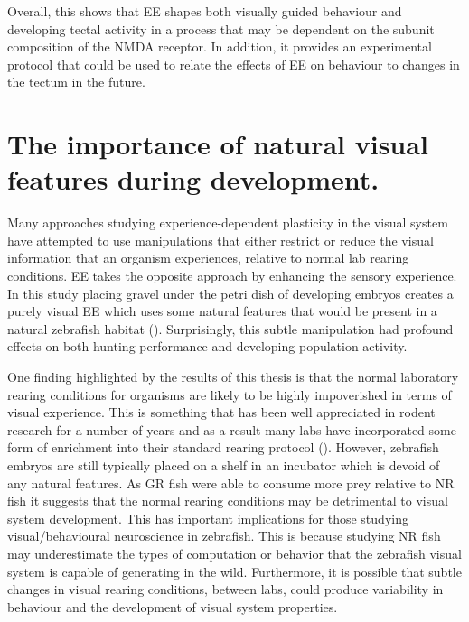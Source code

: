 Overall, this shows that EE shapes both visually guided behaviour and developing tectal activity in a process that may be dependent on the subunit composition of the NMDA receptor. In addition, it provides an experimental protocol that could be used to relate the effects of EE on behaviour to changes in the tectum in the future.


\section{The importance of natural visual features during development.}
Many approaches studying experience-dependent plasticity in the visual system have attempted to use manipulations that either restrict or reduce the visual information that an organism experiences, relative to normal lab rearing conditions. EE takes the opposite approach by enhancing the sensory experience. In this study placing gravel under the petri dish of developing embryos creates a purely visual EE which uses some natural features that would be present in a natural zebrafish habitat (\cite{Engeszer2007ZebrafishField}). Surprisingly, this subtle manipulation had profound effects on both hunting performance and developing population activity. 

One finding highlighted by the results of this thesis is that the normal laboratory rearing conditions for organisms are likely to be highly impoverished in terms of visual experience. This is something that has been well appreciated in rodent research for a number of years and as a result many labs have incorporated some form of enrichment into their standard rearing protocol (\cite{Bayne2018EnvironmentalPerspectives}). However, zebrafish embryos are still typically placed on a shelf in an incubator which is devoid of any natural features.  
As GR fish were able to consume more prey relative to NR fish it suggests that the normal rearing conditions may be detrimental to visual system development. This has important implications for those studying visual/behavioural neuroscience in zebrafish. This is because studying NR fish may underestimate the types of computation or behavior that the zebrafish visual system is capable of generating in the wild. Furthermore, it is possible that subtle changes in visual rearing conditions, between labs, could produce variability in behaviour and the development of visual system properties. 

